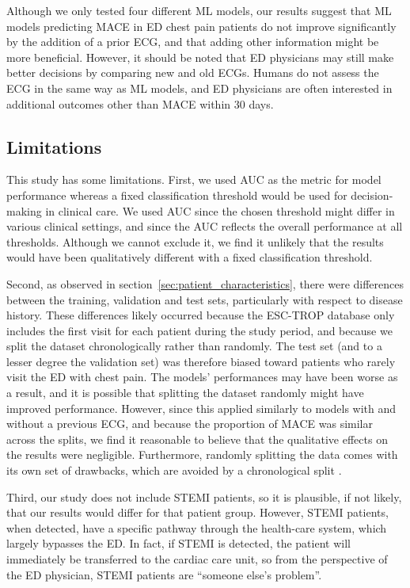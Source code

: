 \documentclass[preprint]{elsarticle}
\begin{document}
Although we only tested four different ML models, our results suggest that ML models predicting MACE in ED chest pain patients do not improve significantly by the addition of a prior ECG, and that adding other information might be more beneficial. However, it should be noted that ED physicians may still make better decisions by comparing new and old ECGs. Humans do not assess the ECG in the same way as ML models, and ED physicians are often interested in additional outcomes other than MACE within 30 days.

\subsection{Limitations}
This study has some limitations. First, we used AUC as the metric for model performance whereas a fixed classification threshold would be used for decision-making in clinical care. We used AUC since the chosen threshold might differ in various clinical settings, and since the AUC reflects the overall performance at all thresholds. Although we cannot exclude it, we find it unlikely that the results would have been qualitatively different with a fixed classification threshold.

Second, as observed in section~\ref{sec:patient_characteristics}, there were differences between the training, validation and test sets, particularly with respect to disease history. These differences likely occurred because the ESC-TROP database only includes the first visit for each patient during the study period, and because we split the dataset chronologically rather than randomly. The test set (and to a lesser degree the validation set) was therefore biased toward patients who rarely visit the ED with chest pain. The models' performances may have been worse as a result, and it is possible that splitting the dataset randomly might have improved performance. However, since this applied similarly to models with and without a previous ECG, and because the proportion of MACE was similar across the splits, we find it reasonable to believe that the qualitative effects on the results were negligible. Furthermore, randomly splitting the data comes with its own set of drawbacks, which are avoided by a chronological split \citep{steyerberg2009}.

Third, our study does not include STEMI patients, so it is plausible, if not likely, that our results would differ for that patient group. However, STEMI patients, when detected, have a specific pathway through the health-care system, which largely bypasses the ED. In fact, if STEMI is detected, the patient will immediately be transferred to the cardiac care unit, so from the perspective of the ED physician, STEMI patients are ``someone else's problem''.
\end{document}
